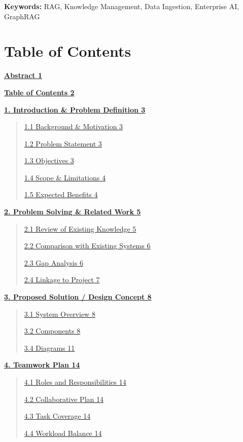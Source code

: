 \documentclass[12pt]{article}
\begin{document}
\textbf{Keywords:} RAG, Knowledge Management, Data Ingestion, Enterprise
AI, GraphRAG

\section{Table of Contents}\label{table-of-contents}

\hyperref[abstract]{\textbf{Abstract 1}}

\hyperref[table-of-contents]{\textbf{Table of Contents 2}}

\hyperref[introduction-problem-definition]{\textbf{1. Introduction \&
Problem Definition 3}}

\begin{quote}
\hyperref[background-motivation]{1.1 Background \& Motivation 3}

\hyperref[problem-statement]{1.2 Problem Statement 3}

\hyperref[objectives]{1.3 Objectives 3}

\hyperref[scope-limitations]{1.4 Scope \& Limitations 4}

\hyperref[expected-benefits]{1.5 Expected Benefits 4}
\end{quote}

\hyperref[problem-solving-related-work]{\textbf{2. Problem Solving \&
Related Work 5}}

\begin{quote}
\hyperref[review-of-existing-knowledge]{2.1 Review of Existing Knowledge
5}

\hyperref[comparison-with-existing-systems]{2.2 Comparison with Existing
Systems 6}

\hyperref[gap-analysis]{2.3 Gap Analysis 6}

\hyperref[linkage-to-project]{2.4 Linkage to Project 7}
\end{quote}

\hyperref[proposed-solution-design-concept]{\textbf{3. Proposed Solution
/ Design Concept 8}}

\begin{quote}
\hyperref[system-overview]{3.1 System Overview 8}

\hyperref[components]{3.2 Components 8}

\hyperref[diagrams]{3.4 Diagrams 11}
\end{quote}

\hyperref[teamwork-plan]{\textbf{4. Teamwork Plan 14}}

\begin{quote}
\hyperref[roles-and-responsibilities]{4.1 Roles and Responsibilities 14}

\hyperref[collaborative-plan]{4.2 Collaborative Plan 14}

\hyperref[task-coverage]{4.3 Task Coverage 14}

\hyperref[workload-balance]{4.4 Workload Balance 14}
\end{quote}
\end{document}
